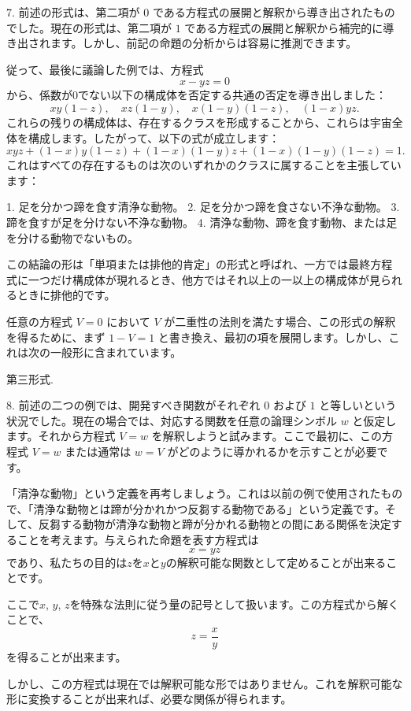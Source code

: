 \documentclass[a4paper,11pt,openany]{ltjsbook}
\begin{document}
7. 前述の形式は、第二項が $0$ である方程式の展開と解釈から導き出されたものでした。現在の形式は、第二項が $1$ である方程式の展開と解釈から補完的に導き出されます。しかし、前記の命題の分析からは容易に推測できます。

従って、最後に議論した例では、方程式
\[
x - yz = 0
\]
から、係数が0でない以下の構成体を否定する共通の否定を導き出しました：
\[
xy(1-z), \quad xz(1-y), \quad x(1-y)(1-z), \quad (1-x)yz.
\]
これらの残りの構成体は、存在するクラスを形成することから、これらは宇宙全体を構成します。したがって、以下の式が成立します：
\[
xyz + (1-x)y(1-z) + (1-x)(1-y)z + (1-x)(1-y)(1-z) = 1.
\]
これはすべての存在するものは次のいずれかのクラスに属することを主張しています：

1. 足を分かつ蹄を食す清浄な動物。
2. 足を分かつ蹄を食さない不浄な動物。
3. 蹄を食すが足を分けない不浄な動物。
4. 清浄な動物、蹄を食す動物、または足を分ける動物でないもの。

この結論の形は「単項または排他的肯定」の形式と呼ばれ、一方では最終方程式に一つだけ構成体が現れるとき、他方ではそれ以上の一以上の構成体が見られるときに排他的です。

任意の方程式 $V=0$ において $V$ が二重性の法則を満たす場合、この形式の解釈を得るために、まず $1-V=1$ と書き換え、最初の項を展開します。しかし、これは次の一般形に含まれています。

\begin{center}
\textsc{第三形式}.
\end{center}

8. 前述の二つの例では、開発すべき関数がそれぞれ $0$ および $1$ と等しいという状況でした。現在の場合では、対応する関数を任意の論理シンボル $w$ と仮定します。それから方程式 $V = w$ を解釈しようと試みます。ここで最初に、この方程式 $V=w$ または通常は $w=V$ がどのように導かれるかを示すことが必要です。

「清浄な動物」という定義を再考しましょう。これは以前の例で使用されたもので、「清浄な動物とは蹄が分かれかつ反芻する動物である」という定義です。そして、反芻する動物が清浄な動物と蹄が分かれる動物との間にある関係を決定することを考えます。与えられた命題を表す方程式は
\[
x = yz
\]
であり、私たちの目的は$z$を$x$と$y$の解釈可能な関数として定めることが出来ることです。

ここで$x$, $y$, $z$を特殊な法則に従う量の記号として扱います。この方程式から解くことで、
\[
z = \frac{x}{y}
\]
を得ることが出来ます。

しかし、この方程式は現在では解釈可能な形ではありません。これを解釈可能な形に変換することが出来れば、必要な関係が得られます。
\end{document}
